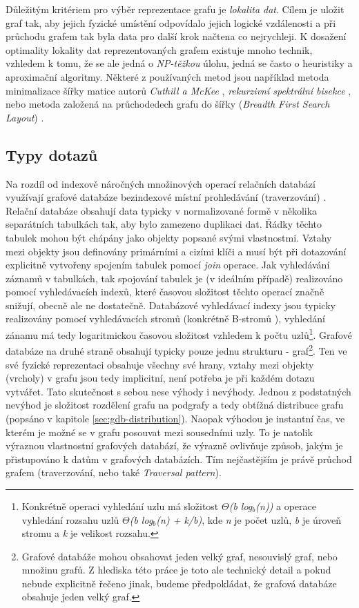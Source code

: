 Důležitým kritériem pro výběr reprezentace grafu je \textit{lokalita dat}. Cílem je uložit graf tak, aby jejich fyzické umístění odpovídalo jejich logické vzdálenosti a při průchodu grafem tak byla data pro další krok načtena co nejrychleji. K dosažení optimality lokality dat reprezentovaných grafem existuje mnoho technik, vzhledem k tomu, že se ale jedná o \textit{NP-těžkou} úlohu, jedná se často o heuristiky a aproximační algoritmy. Některé z používaných metod jsou například metoda minimalizace šířky matice autorů \textit{Cuthill a McKee} \cite{Cuthill69}, \textit{rekurzivní spektrální bisekce} \cite{Barnard93}, nebo metoda založená na průchodedech grafu do šířky (\textit{Breadth First Search Layout}) \cite{Furaih98}.


\subsection{Typy dotazů}
\label{sec:gdb-dotazy}

Na rozdíl od indexově náročných množinových operací relačních databází využívají grafové databáze bezindexové místní prohledávání (traverzování) \cite{Anglels08}. Relační databáze obsahují data typicky v normalizované formě v několika separátních tabulkách tak, aby bylo zamezeno duplikaci dat. Řádky těchto tabulek mohou být chápány jako objekty popsané svými vlastnostmi. Vztahy mezi objekty jsou definovány primárními a cizími klíči a musí být při dotazování explicitně vytvořeny spojením tabulek pomocí \textit{join} operace. Jak vyhledávání záznamů v tabulkách, tak spojování tabulek je (v ideálním případě) realizováno pomocí vyhledávacích indexů, které časovou složitost těchto operací značně snižují, obecně ale ne dostatečně. Databázové vyhledávací indexy jsou typicky realizovány pomocí vyhledávacích stromů (konkrétně B-stromů \cite{Leach05}), vyhledání zánamu má tedy logaritmickou časovou složitost vzhledem k počtu uzlů\footnote{Konkrétně operaci vyhledání uzlu má složitost \textit{$\Theta$(b log$_b$(n))} a operace vyhledání rozsahu uzlů \textit{$\Theta$(b log$_b$(n) + k/b)}, kde \textit{n} je počet uzlů, \textit{b} je úroveň stromu a \textit{k} je velikost rozsahu.\cite{Cormen09}}.
Grafové databáze na druhé straně obsahují typicky pouze jednu strukturu - graf\footnote{Grafové databáže mohou obsahovat jeden velký graf, nesouvislý graf, nebo množinu grafů. Z hlediska této práce je toto ale technický detail a pokud nebude explicitně řečeno jinak, budeme předpokládat, že grafová databáze obsahuje jeden velký graf.}. Ten ve své fyzické reprezentaci obsahuje všechny své hrany, vztahy mezi objekty (vrcholy) v grafu jsou tedy implicitní, není potřeba je při každém dotazu vytvářet. Tato skutečnost s sebou nese výhody i nevýhody. Jednou z podstatných nevýhod je složitost rozdělení grafu na podgrafy a tedy obtížná distribuce grafu (popsáno v kapitole \ref{sec:gdb-distribution}). Naopak výhodou je instantní čas, ve kterém je možné se v grafu posouvat mezi sousedními uzly. To je natolik výraznou vlastnostní grafových databází, že výrazně ovlivňuje způsob, jakým je přistupováno k datům v grafových databázích. Tím nejčastějším je právě průchod grafem (traverzování, nebo také \textit{Traversal pattern}).

